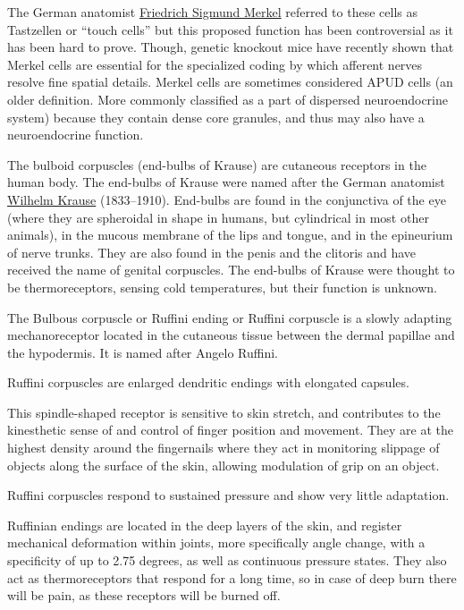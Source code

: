 The German anatomist \href{https://en.wikipedia.org/wiki/Friedrich_Sigmund_Merkel}{Friedrich Sigmund Merkel} referred to these cells as Tastzellen or ``touch cells'' but this proposed function has been controversial as it has been hard to prove. Though, genetic knockout mice have recently shown that Merkel cells are essential for the specialized coding by which afferent nerves resolve fine spatial details. Merkel cells are sometimes considered APUD cells (an older definition. More commonly classified as a part of dispersed neuroendocrine system) because they contain dense core granules, and thus may also have a neuroendocrine function.

The bulboid corpuscles (end-bulbs of Krause) are cutaneous receptors in the human body. The end-bulbs of Krause were named after the German anatomist \href{https://en.wikipedia.org/wiki/Wilhelm_Krause}{Wilhelm Krause} (1833--1910). End-bulbs are found in the conjunctiva of the eye (where they are spheroidal in shape in humans, but cylindrical in most other animals), in the mucous membrane of the lips and tongue, and in the epineurium of nerve trunks. They are also found in the penis and the clitoris and have received the name of genital corpuscles. The end-bulbs of Krause were thought to be thermoreceptors, sensing cold temperatures, but their function is unknown.

The Bulbous corpuscle or Ruffini ending or Ruffini corpuscle is a slowly adapting mechanoreceptor located in the cutaneous tissue between the dermal papillae and the hypodermis. It is named after Angelo Ruffini.

Ruffini corpuscles are enlarged dendritic endings with elongated capsules.

This spindle-shaped receptor is sensitive to skin stretch, and contributes to the kinesthetic sense of and control of finger position and movement. They are at the highest density around the fingernails where they act in monitoring slippage of objects along the surface of the skin, allowing modulation of grip on an object.

Ruffini corpuscles respond to sustained pressure and show very little adaptation.

Ruffinian endings are located in the deep layers of the skin, and register mechanical deformation within joints, more specifically angle change, with a specificity of up to 2.75 degrees, as well as continuous pressure states. They also act as thermoreceptors that respond for a long time, so in case of deep burn there will be pain, as these receptors will be burned off.

